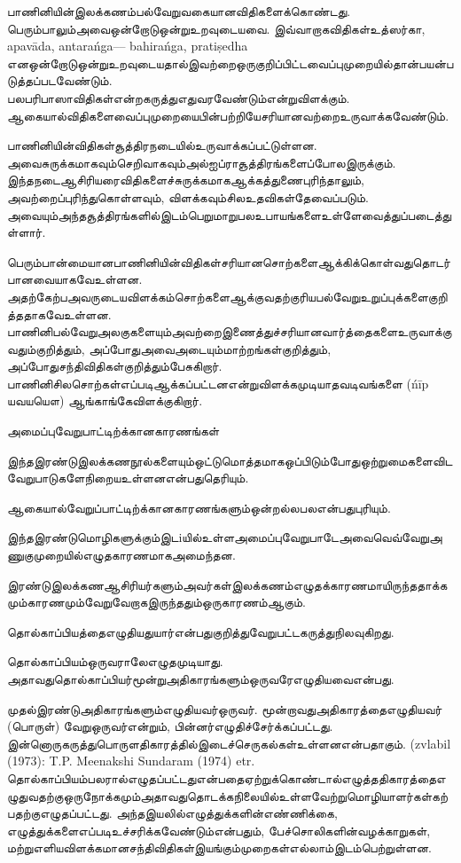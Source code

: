  \item பாணினியின்இலக்கணம்பல்வேறுவகையானவிதிகளைக்கொண்டது. பெரும்பாலும்அவைஒன்றோடுஒன்றுஉறவுடையவை. இவ்வாறாகவிதிகள்உத்ஸர்கா, apavāda, antarańga–– bahirańga, pratiṣedha எனஒன்றோடுஒன்றுஉறவுடையதால்இவற்றைஒருகுறிப்பிட்டவைப்புமுறையில்தான்பயன்படுத்தப்படவேண்டும். பலபரிபாஸாவிதிகள்என்றகருத்துஎதுவரவேண்டும்என்றுவிளக்கும். ஆகையால்விதிகளைவைப்புமுறையைபின்பற்றியேசரியானவற்றைஉருவாக்கவேண்டும்.

 \item பாணினியின்விதிகள்சூத்திரநடையில்உருவாக்கப்பட்டுள்ளன. அவைசுருக்கமாகவும்செறிவாகவும்அல்ஐப்ராசூத்திரங்களைப்போலஇருக்கும். இந்தநடைஆசிரியரைவிதிகளைச்சுருக்கமாகஆக்கத்துணைபுரிந்தாலும், அவற்றைப்புரிந்துகொள்ளவும், விளக்கவும்சிலஉதவிகள்தேவைப்படும். அவையும்அந்தசூத்திரங்களில்இடம்பெறுமாறுபலஉபாயங்களைஉள்ளேவைத்துப்படைத்துள்ளார்.

 \item பெரும்பான்மையானபாணினியின்விதிகள்சரியானசொற்களைஆக்கிக்கொள்வதுதொடர்பானவையாகவேஉள்ளன. அதற்கேற்பஅவருடையவிளக்கம்சொற்களைஆக்குவதற்குரியபல்வேறுஉறுப்புக்களைகுறித்ததாகவேஉள்ளன. பாணினிபல்வேறுஅலகுகளையும்அவற்றைஇணைத்துச்சரியானவார்த்தைகளைஉருவாக்குவதும்குறித்தும், அப்போதுஅவைஅடையும்மாற்றங்கள்குறித்தும், அப்போதுசந்திவிதிகள்குறித்தும்பேசுகிறார். பாணினிசிலசொற்கள்எப்படிஆக்கப்பட்டனஎன்றுவிளக்கமுடியாதவடிவங்களை (ńīp யவயயௌ) ஆங்காங்கேவிளக்குகிறார்.



அமைப்புவேறுபாட்டிற்க்கானகாரணங்கள்

இந்தஇரண்டுஇலக்கணநூல்களையும்ஒட்டுமொத்தமாகஒப்பிடும்போதுஒற்றுமைகளைவிடவேறுபாடுகளேநிறையஉள்ளனஎன்பதுதெரியும். 

ஆகையால்வேறுப்பாட்டிற்க்கானகாரணங்களும்ஒன்றல்லபலஎன்பதுபுரியும்.

\item இந்தஇரண்டுமொழிகளுக்கும்இடiயில்உள்ளஅமைப்புவேறுபாடேஅவைவெவ்வேறுஅணுகுமுறையில்எழுதகாரணமாகஅமைந்தன.

 \item இரண்டுஇலக்கணஆசிரியர்களும்அவர்கள்இலக்கணம்எழுதக்காரணமாயிருந்ததாக்கமும்காரணமும்வேறுவேறாகஇருந்ததும்ஒருகாரணம்ஆகும்.

 \item தொல்காப்பியத்தைஎழுதியதுயார்என்பதுகுறித்துவேறுபட்டகருத்துநிலவுகிறது.

\item தொல்காப்பியம்ஒருவராலேஎழுதமுடியாது. அதாவதுதொல்காப்பியர்மூன்றுஅதிகாரங்களும்ஒருவரேஎழுதியவைஎன்பது.

 \item முதல்இரண்டுஅதிகாரங்களும்எழுதியவர்ஒருவர். மூன்றாவதுஅதிகாரத்தைஎழுதியவர் (பொருள்) வேறுஒருவர்என்றும், பின்னர்எழுதிச்சேர்க்கப்பட்டது. இன்னொருகருத்துபொருளதிகாரத்தில்இடைச்செருகல்கள்உள்ளனஎன்பதாகும். (zvlabil (1973): T.P. Meenakshi Sundaram (1974) etr. தொல்காப்பியம்பலரால்எழுதப்பட்டதுஎன்பதைஏற்றுக்கொண்டால்எழுத்ததிகாரத்தைஎழுதுவதற்குஒருநோக்கமும்அதாவதுதொடக்கநிலையில்உள்ளவேற்றுமொழியாளர்கள்கற்பதற்குஎழுதப்பட்டது. அந்தஇயலில்எழுத்துக்களின்எண்ணிக்கை, எழுத்துக்களைஎப்படிஉச்சரிக்கவேண்டும்என்பதும், பேச்சொலிகளின்வழக்காறுகள், மற்றுஎளியவிளக்கமானசந்திவிதிகள்இயங்கும்முறைகள்எல்லாம்இடம்பெற்றுள்ளன.

